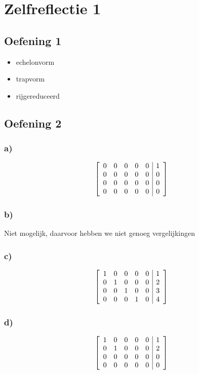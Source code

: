 \documentclass[lineaire_algebra_oplossingen.tex]{subfiles}
\begin{document}
\section{Zelfreflectie 1}
\subsection{Oefening 1}
\begin{itemize}
\item echelonvorm
\item trapvorm
\item rijgereduceerd
\end{itemize}
\subsection{Oefening 2}
\subsubsection*{a)}
\[
\left[
\begin{array}{l l l l l | r}
0 & 0 & 0 & 0 & 0 & 1\\
0 & 0 & 0 & 0 & 0 & 0\\
0 & 0 & 0 & 0 & 0 & 0\\
0 & 0 & 0 & 0 & 0 & 0\\
\end{array}
\right]
\]
\subsubsection*{b)}
Niet mogelijk, daarvoor hebben we niet genoeg vergelijkingen
\subsubsection*{c)}
\[
\left[
\begin{array}{l l l l l | r}
1 & 0 & 0 & 0 & 0 & 1\\
0 & 1 & 0 & 0 & 0 & 2\\
0 & 0 & 1 & 0 & 0 & 3\\
0 & 0 & 0 & 1 & 0 & 4\\
\end{array}
\right]
\]
\subsubsection*{d)}
\[
\left[
\begin{array}{l l l l l | r}
1 & 0 & 0 & 0 & 0 & 1\\
0 & 1 & 0 & 0 & 0 & 2\\
0 & 0 & 0 & 0 & 0 & 0\\
0 & 0 & 0 & 0 & 0 & 0\\
\end{array}
\right]
\]
\end{document}
